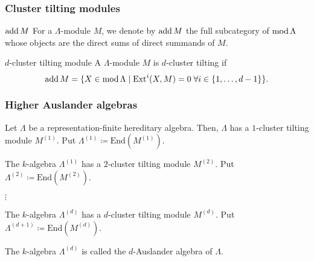 \begin{frame}
 \frametitle{Cluster tilting modules}
 \begin{block}{$\operatorname{add} M$}
 	For a $\Lambda$-module $M$, we denote by $\operatorname{add} M$ the full subcategory of
 	$\operatorname{mod} \Lambda$ whose objects are the direct sums of direct summands of $M$.
 \end{block}
 \pause
 \begin{alertblock}{$d$-cluster tilting module}
 	A $\Lambda$-module $M$ is $d$-cluster tilting if
 	\[
 	 \operatorname{add} M = \{X \in \operatorname{mod} \Lambda \mid \mathrm{Ext}^{i}(X,M) = 0 \; \forall i
 	 \in \{1,\ldots,d-1\}\}.
 	\]
 \end{alertblock}
\end{frame}

\begin{frame}
 \frametitle{Higher Auslander algebras}
 \begin{const}
 	Let $\Lambda$ be a representation-finite hereditary algebra. Then, $\Lambda$
 	has a $1$-cluster tilting module $M^{(1)}$. Put $\Lambda^{(1)} \coloneqq
 	\mathrm{End}(M^{(1)})$.
 	\pause

 	The $k$-algebra $\Lambda^{(1)}$ has a $2$-cluster tilting module $M^{(2)}$.
 	Put $\Lambda^{(2)} \coloneqq \mathrm{End}(M^{(2)})$.
 	\pause

 	\centerline{$\vdots$}

 	The $k$-algebra $\Lambda^{(d)}$ has a $d$-cluster tilting module $M^{(d)}$.
 	Put $\Lambda^{(d+1)} \coloneqq \mathrm{End}(M^{(d)})$.
 \end{const}
 \pause
 The $k$-algebra $\Lambda^{(d)}$ is called the $d$-Auslander algebra of
 $\Lambda$.
\end{frame}

